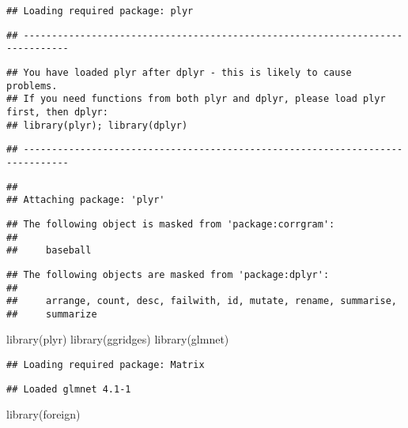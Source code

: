 \documentclass[
]{article}
\newenvironment{Shaded}{\begin{snugshade}}{\end{snugshade}}
\newcommand{\FunctionTok}[1]{\textcolor[rgb]{0.00,0.00,0.00}{#1}}
\newcommand{\NormalTok}[1]{#1}
\begin{document}
\begin{verbatim}
## Loading required package: plyr
\end{verbatim}

\begin{verbatim}
## ------------------------------------------------------------------------------
\end{verbatim}

\begin{verbatim}
## You have loaded plyr after dplyr - this is likely to cause problems.
## If you need functions from both plyr and dplyr, please load plyr first, then dplyr:
## library(plyr); library(dplyr)
\end{verbatim}

\begin{verbatim}
## ------------------------------------------------------------------------------
\end{verbatim}

\begin{verbatim}
## 
## Attaching package: 'plyr'
\end{verbatim}

\begin{verbatim}
## The following object is masked from 'package:corrgram':
## 
##     baseball
\end{verbatim}

\begin{verbatim}
## The following objects are masked from 'package:dplyr':
## 
##     arrange, count, desc, failwith, id, mutate, rename, summarise,
##     summarize
\end{verbatim}

\begin{Shaded}
\begin{Highlighting}[]
\FunctionTok{library}\NormalTok{(plyr)}
\FunctionTok{library}\NormalTok{(ggridges)}
\FunctionTok{library}\NormalTok{(glmnet)}
\end{Highlighting}
\end{Shaded}

\begin{verbatim}
## Loading required package: Matrix
\end{verbatim}

\begin{verbatim}
## Loaded glmnet 4.1-1
\end{verbatim}

\begin{Shaded}
\begin{Highlighting}[]
\FunctionTok{library}\NormalTok{(foreign)}
\end{Highlighting}
\end{Shaded}
\end{document}

